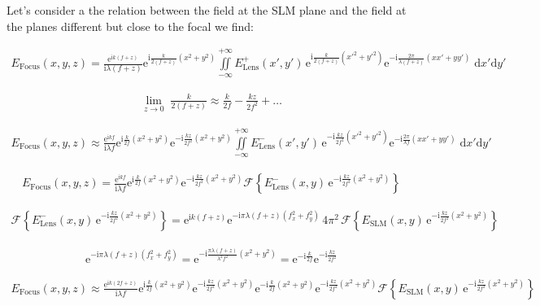 \documentclass[a4paper,11pt,onecolumn]{scrartcl}
\renewcommand{\i}{\mathrm i}
\newcommand{\e}{\mathrm e}
\begin{document}
Let's consider a the relation between the field at the SLM plane and the field at the planes different but close to the focal we find:

\begin{align}
E_\mathrm{Focus}(x,y,z) = \frac{\mathrm e^{\i k(f+z)}}{\i\lambda (f+z)}\e^{\i\frac{k}{2(f+z)}(x^2+y^2)}\iint\limits_{-\infty}^{+\infty} E_\mathrm{Lens}^+(x', y')\,\e^{\i\frac{k}{2(f+z)}(x'^2 + y'^2)}\e^{-\i\frac{2\pi}{\lambda (f+z)}(xx'+yy')}\;\mathrm dx'\mathrm dy'
\end{align}

\begin{align}
\lim\limits_{z \rightarrow 0}\;\frac{k}{2(f + z)} \approx \frac{k}{2 f} - \frac{kz}{2f^2} + \dots
\end{align}

\begin{align}
E_\mathrm{Focus}(x,y,z) \approx \frac{\mathrm e^{\i kf}}{\i\lambda f}\e^{\i\frac{k}{2f}(x^2+y^2)}\e^{-\i\frac{kz}{2f^2}(x^2+y^2)}\iint\limits_{-\infty}^{+\infty} E_\mathrm{Lens}^-(x', y')\,\e^{-\i\frac{kz}{2f^2}(x'^2 + y'^2)}\e^{-\i\frac{2\pi}{\lambda f}(xx'+yy')}\;\mathrm dx'\mathrm dy'
\end{align}

\begin{align}
E_\mathrm{Focus}(x,y,z) = \frac{\mathrm e^{\i kf}}{\i\lambda f}\e^{\i\frac{k}{2f}(x^2+y^2)}\e^{-\i\frac{kz}{2f^2}(x^2+y^2)}\mathcal F\left\{E_\mathrm{Lens}^-(x, y)\,\e^{-\i\frac{kz}{2f^2}(x^2 + y^2)}\right\}
\end{align}

\begin{align}
\mathcal F\left\{E_\mathrm{Lens}^-(x, y)\,\e^{-\i\frac{kz}{2f^2}(x^2 + y^2)}\right\} = \e^{\i k(f+z)}\e^{-\i\pi\lambda (f+z)(f_x^2+f_y^2)}\,4\pi^2\,\mathcal F\left\{E_\mathrm{SLM}(x, y)\,\e^{-\i\frac{kz}{2f^2}(x^2 + y^2)}\right\}
\end{align}

\begin{align}
\e^{-\i\pi\lambda (f+z)(f_x^2+f_y^2)} = \e^{-\i\frac{\pi\lambda (f+z)}{\lambda^2f^2}(x^2+y^2)} = \e^{-\i\frac{k}{2f}}\e^{-\i\frac{kz}{2f^2}}
\end{align}


\begin{align}
E_\mathrm{Focus}(x,y,z) \approx \frac{\mathrm e^{\i k(2f + z)}}{\i\lambda f}\e^{\i\frac{k}{2f}(x^2+y^2)}\e^{-\i\frac{kz}{2f^2}(x^2+y^2)}\e^{-\i\frac{k}{2f}(x^2+y^2)}\e^{-\i\frac{kz}{2f^2}(x^2+y^2)}\mathcal F\left\{E_\mathrm{SLM}(x, y)\,\e^{-\i\frac{kz}{2f^2}(x^2 + y^2)}\right\}
\end{align}
\end{document}
